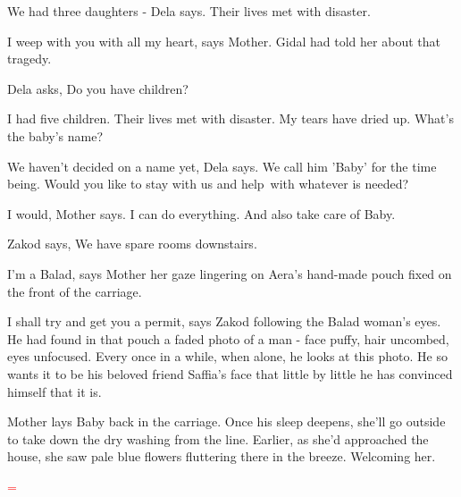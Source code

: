 \documentclass[letterpaper]{article}
\begin{document}
{\textquotedbl}We had three daughters -{\textquotedbl} Dela says. {\textquotedbl}Their lives met with
disaster.{\textquotedbl} 

{\textquotedbl}I weep with you with all my heart,{\textquotedbl} says Mother. Gidal had told her about that tragedy. 

Dela asks, {\textquotedbl}Do you have children?{\textquotedbl} 

{\textquotedbl}I had five children. Their lives met with disaster. My tears have dried up. What's the baby's
name?{\textquotedbl} 

{\textquotedbl}We haven't decided on a name yet,{\textquotedbl} Dela says. {\textquotedbl}We call him 'Baby' for the
time being. Would you like to stay with us and help~with whatever is needed?{\textquotedbl} 

{\textquotedbl}I would,{\textquotedbl} Mother says. {\textquotedbl}I can do everything. And also take care of
Baby.{\textquotedbl} 

Zakod says, {\textquotedbl}We have spare rooms downstairs.{\textquotedbl} 

{\textquotedbl}I'm a Balad,{\textquotedbl} says Mother her gaze lingering on Aera's hand-made pouch fixed on the front
of the carriage. 

{\textquotedbl}I shall try and get you a permit,{\textquotedbl} says Zakod following the Balad woman's eyes. He had
found in that pouch a faded photo of a man - face puffy, hair uncombed, eyes unfocused. Every once in a while, when
alone, he looks at this photo. He so wants it to be his beloved friend Saffia's face that little by little he has
convinced himself that it is. 

Mother lays Baby back in the carriage. Once his sleep deepens, she'll go outside to take down the dry washing from the
line. Earlier, as she'd approached the house, she saw pale blue flowers fluttering there in the breeze. Welcoming her.


\bigskip


\bigskip


\bigskip

\textcolor{red}{=}


\bigskip
\end{document}
